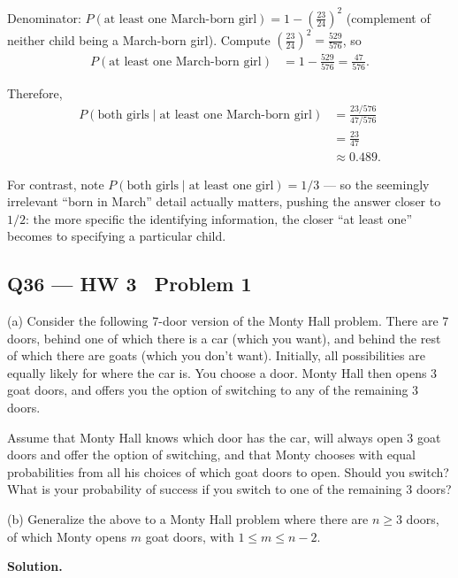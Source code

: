 \documentclass[11pt]{article}
\begin{document}
Denominator: $P(\text{at least one March-born girl}) = 1-\left(\tfrac{23}{24}\right)^2$ (complement of neither child being a March-born girl). Compute $\left(\tfrac{23}{24}\right)^2 = \tfrac{529}{576}$, so
\begin{align*}
P(\text{at least one March-born girl}) &= 1-\frac{529}{576} = \frac{47}{576}.
\end{align*}

Therefore,
\begin{align*}
P(\text{both girls}\mid\text{at least one March-born girl}) &= \frac{23/576}{47/576} \\
&= \frac{23}{47} \\
&\approx 0.489.
\end{align*}

For contrast, note $P(\text{both girls}\mid\text{at least one girl}) = 1/3$ — so the seemingly irrelevant ``born in March'' detail actually matters, pushing the answer closer to $1/2$: the more specific the identifying information, the closer ``at least one'' becomes to specifying a particular child.

\subsection*{Q36 --- HW 3 \textperiodcentered\ Problem 1}
\begin{qbox}
(a) Consider the following 7-door version of the Monty Hall problem. There are 7 doors, behind one of which there is a car (which you want), and behind the rest of which there are goats (which you don't want). Initially, all possibilities are equally likely for where the car is. You choose a door. Monty Hall then opens 3 goat doors, and offers you the option of switching to any of the remaining 3 doors.

Assume that Monty Hall knows which door has the car, will always open 3 goat doors and offer the option of switching, and that Monty chooses with equal probabilities from all his choices of which goat doors to open. Should you switch? What is your probability of success if you switch to one of the remaining 3 doors?

(b) Generalize the above to a Monty Hall problem where there are $n \geq 3$ doors, of which Monty opens $m$ goat doors, with $1 \leq m \leq n-2$.
\end{qbox}
\textbf{Solution.}
\end{document}

